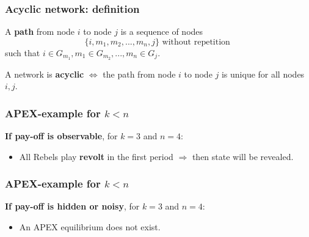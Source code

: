 \documentclass[9pt]{beamer}
\begin{document}
\begin{frame}
  \frametitle{Acyclic network: definition}


\begin{definition}
A \textbf{path} from node $i$ to node $j$ is a sequence of nodes \[\{i,m_1,m_2,...,m_n,j\} \text{ without repetition }\] such that $i\in G_{m_1},m_1\in G_{m_2},...,m_n\in G_j$. 
\end{definition}  

\begin{definition}
A network is \textbf{acyclic} $\Leftrightarrow$ the path from node $i$ to node $j$ is unique for all nodes $i,j$. 
\end{definition}  

\end{frame}


\begin{frame}
  \frametitle{APEX-example for $k<n$}

\alert{\textbf{If pay-off is observable}}, for $k=3$ and $n=4$:
  \begin{center}
\end{center}

\begin{itemize}[<+->]
\item All Rebels play \textbf{revolt} in the first period $\Rightarrow$ then state will be revealed.
\end{itemize}

  
\end{frame}

\begin{frame}
  \frametitle{APEX-example for $k<n$}

\alert{\textbf{If pay-off is hidden or noisy}}, for $k=3$ and $n=4$:
  \begin{center}
\end{center}

\begin{itemize}[<+->]
\item An APEX equilibrium does not exist.
\end{itemize}

  
\end{frame}
\end{document}
